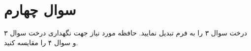 \section{سوال چهارم}

درخت سوال ۳ را به فرم  تبدیل نمایید. حافظه مورد نیاز جهت نگهداری درخت سوال ۳ و سوال ۴ را مقایسه کنید.

\begin{qsolve}
	
\end{qsolve}